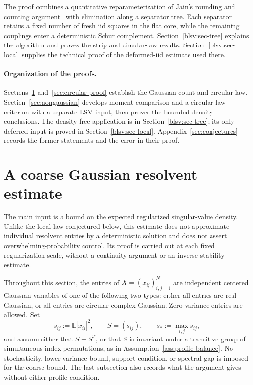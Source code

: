 \documentclass[11pt,reqno]{amsart}
\numberwithin{equation}{section}
\theoremstyle{plain}
\theoremstyle{definition}
\theoremstyle{remark}
\begin{document}
The proof combines a quantitative reparameterization of Jain's rounding
and counting argument~\cite{blsvJain} with elimination along a separator
tree. Each separator retains a fixed number of fresh iid squares in the
flat core, while the remaining couplings enter a deterministic Schur
complement. Section~\ref{blsv:sec-tree} explains the algorithm and proves the strip
and circular-law results. Section~\ref{blsv:sec-local} supplies the
technical proof of the deformed-iid estimate used there.

\paragraph{Organization of the proofs.}
Sections~\ref{sec:coarse} and~\ref{sec:circular-proof} establish the
Gaussian count and circular law. Section~\ref{sec:nongaussian} develops
moment comparison and a circular-law criterion with a separate LSV
input, then proves the bounded-density conclusions. The density-free
application is in Section~\ref{blsv:sec-tree}; its only deferred input
is proved in Section~\ref{blsv:sec-local}. Appendix~\ref{sec:conjectures}
records the former statements and the error in their proof.

\section{A coarse Gaussian resolvent estimate}\label{sec:coarse}

The main input is a bound on the expected regularized singular-value
density.  Unlike the local law conjectured below, this estimate does not
approximate individual resolvent entries by a deterministic solution and
does not assert overwhelming-probability control.  Its proof is carried out
at each fixed regularization scale, without a continuity argument or an
inverse stability estimate.

Throughout this section, the entries of $X=(x_{ij})_{i,j=1}^N$ are
independent centered Gaussian variables of one of the following two types:
either all entries are real Gaussian, or all entries are circular complex
Gaussian.  Zero-variance entries are allowed.  Set
\[
 s_{ij}:=\mathbb E|x_{ij}|^2,\qquad S=(s_{ij}),\qquad
 s_*:=\max_{i,j}s_{ij},
\]
and assume either that $S=S^T$, or that $S$ is invariant under a transitive
group of simultaneous index permutations, as in
Assumption~\ref{ass:profile-balance}.  No stochasticity, lower variance
bound, support condition, or spectral gap is imposed for the coarse bound.
The last subsection also records what the argument gives without either
profile condition.
\end{document}
